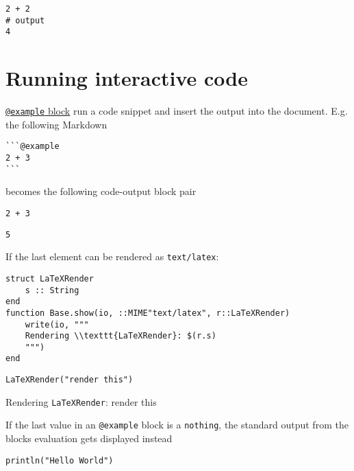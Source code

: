 \begin{verbatim}
2 + 2
# output
4
\end{verbatim}



\section{Running interactive code}



\label{3545462789522369084}{}


\href{@ref}{\texttt{@example} block} run a code snippet and insert the output into the document. E.g. the following Markdown




\begin{lstlisting}
```@example
2 + 3
```
\end{lstlisting}



becomes the following code-output block pair




\begin{verbatim}
2 + 3
\end{verbatim}


\begin{lstlisting}
5
\end{lstlisting}



If the last element can be rendered as \texttt{text/latex}:




\begin{verbatim}
struct LaTeXRender
    s :: String
end
function Base.show(io, ::MIME"text/latex", r::LaTeXRender)
    write(io, """
    Rendering \\texttt{LaTeXRender}: $(r.s)
    """)
end
\end{verbatim}




\begin{verbatim}
LaTeXRender("render this")
\end{verbatim}

Rendering \texttt{LaTeXRender}: render this


If the last value in an \texttt{@example} block is a \texttt{nothing}, the standard output from the blocks{\textquotesingle} evaluation gets displayed instead




\begin{verbatim}
println("Hello World")
\end{verbatim}



